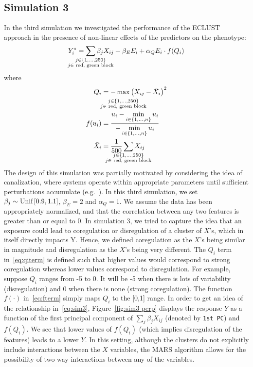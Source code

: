 \subsection*{Simulation 3}
In the third simulation we investigated the performance of the ECLUST approach in the presence of non-linear effects of the predictors on the phenotype:
\begin{equation}
Y_i^* = \sum_{\mathclap{\substack{j\in \left\lbrace 1, \ldots, 250 \right\rbrace\\ j \in \tm{ red, green block}}}}  \beta_j X_{ij}  + \beta_E E_i + \alpha_Q E_i \cdot f(Q_i) \label{eq:sim3}
\end{equation} where 
\begin{align}
Q_i &= - \max_{\mathclap{\substack{\textcolor{white}{text} \\ j\in \left\lbrace 1, \ldots, 250 \right\rbrace\\ j \in \tm{ red, green block}}}}   \left(  X_{ij} - \bar{X}_i   \right)^2   \label{eq:qiterm}\\
f(u_i) &= \frac{u_i - \displaystyle \min_{i \in \left\lbrace 1, \ldots, n \right \rbrace  } u_i}{-\displaystyle \min_{i \in \left\lbrace 1, \ldots, n \right \rbrace  } u_i} \label{eq:fterm}\\
\bar{X}_i &= \frac{1}{500} \sum_{\mathclap{\substack{j\in \left\lbrace 1, \ldots, 250 \right\rbrace\\ j \in \tm{ red, green block}}}} X_{ij} \nonumber
\end{align}
The design of this simulation was partially motivated by considering the idea of canalization, where systems operate within appropriate parameters until sufficient perturbations accumulate (e.g.~\cite{gibson2009decanalization}). In this third simulation, we set $\beta_j \sim \textrm{{Unif}}\left[ 0.9,1.1\right]$, \mbox{$\beta_E = 2$} and \mbox{$\alpha_Q = 1$}. We assume the data has been appropriately normalized, and that the correlation between any two features is greater than or equal to 0. In simulation 3, we tried to capture the idea that an exposure could lead to coregulation or disregulation of a cluster of $X$'s, which in itself directly impacts Y.  Hence, we defined coregulation as the $X$'s being similar in magnitude and disregulation as the $X$'s being very different. The $Q_i$ term in~\eqref{eq:qiterm} is defined such that higher values would correspond to strong coregulation whereas lower values correspond to disregulation. For example, suppose $Q_i$ ranges from -5 to 0. It will be -5 when there is lots of variability (disregulation) and 0 when there is none (strong coregulation). The function $f(\cdot)$ in~\eqref{eq:fterm} simply maps $Q_i$ to the [0,1] range. In order to get an idea of the relationship in~\eqref{eq:sim3}, Figure~\ref{fig:sim3-perp} displays the response $Y$ as a function of the first principal component of $\sum_j \beta_j X_{ij}$ (denoted by \texttt{1st PC}) and $f(Q_i)$.   We see that lower values of $f(Q_i)$ (which implies disregulation of the features) leads to a lower $Y$. In this setting, although the clusters do not explicitly include interactions between the $X$ variables,  the MARS algorithm allows for the possibility of two way interactions between any of the variables. 
